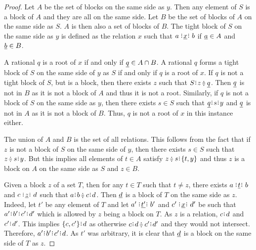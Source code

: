 \documentclass[12pt]{article}
\begin{document}
\begin{proof}
Let $A$ be the set of blocks on the same side as $y$. Then any element of $S$ is a block of $A$ and they are all on the same side. Let $B$ be the set of blocks of $A$ on the same side as $S$. $A$ is then also a set of blocks of $B$. The tight block of $S$ on the same side as $y$ is defined as the relation $x$ such that $a \xrel b$ if $\underline{a} \in A$ and $\underline{b} \in B$. 

A rational $q$ is a root of $x$ if and only if $\underline{q} \in A \cap B$. A rational $q$ forms a tight block of $S$ on the same side of $y$ as $S$  if and only if $q$ is a root of $x$. If $q$ is not a tight block of $S$, but is a block, then there exists $z$ such that $S \rint z \betneq \qrel{q}$. Then $\underline{q}$ is not in $B$ as it is not a block of $A$ and thus it is not a root. Similarly, if $q$ is not a block of $S$ on the same side as $y$, then there exists $s \in S$ such that $\qrel{q} \rint s \rint y$ and $\underline{q}$ is not in $A$ as it is not a block of $B$. Thus, $q$ is not a root of $x$ in this instance either. 

The union of $A$ and $B$ is the set of all relations. This follows from the fact that if $z$ is not a block of $S$ on the same side of $y$, then there exists $s \in S$ such that $z \betneq s \rint y$. But this implies all elements of $t \in A$ satisfy $z \betneq s \rint \{t, y\}$ and thus $z$ is a block on $A$ on the same side as $S$ and $z \in B$. 

Given a block $z$ of a set $T$, then for any $t \in T$ such that $t \neq z$, there exists $a \xrel[t] b$ and $c \xrel[z] d$ such that $a \rint b \betneq c \rint d$. Then $\underline{d}$ is a block of $T$ on the same side as $z$. Indeed, let $t'$ be any element of $T$ and let $a' \xrel[t'] b'$ and $c' \xrel d'$ be such that $a' \rint b' \rint c' \rint d'$ which is allowed by $z$ being a block on $T$. As $z$ is a relation, $c \rint d$ and $c' \rint d'$. This implies $\{c, c'\} \rint d$ as otherwise $c \rint d \betneq c'\rint d'$ and they would not intersect. Therefore, $a' \rint b' \rint c' \rint d$. As $t'$ was arbitrary, it is clear that $\underline{d}$ is a block on the same side of $T$ as $z$.  


\end{proof}
\end{document}
